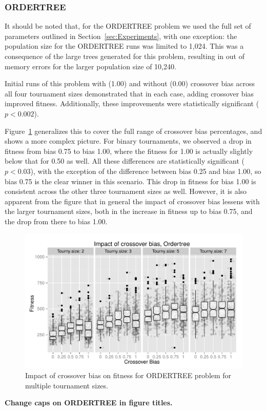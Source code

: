 \documentclass{sig-alternate}
\begin{document}
\subsubsection{ORDERTREE}

It should be noted that, for the ORDERTREE problem we used the full set of parameters outlined in
Section~\ref{sec:Experiments}, with one exception: the population size for the ORDERTREE runs was limited to 1,024.
This was a consequence of the large trees generated for this problem, resulting in out of memory errors for the larger
population size of 10,240.

Initial runs of this problem with (1.00) and without (0.00) crossover bias across all four tournament sizes
demonstrated that in each case, adding crossover bias improved fitness. Additionally, these improvements were
statistically significant ($p < 0.002$).

Figure~\ref{fig:Ordertree_results_all_tournaments_Jan15} generalizes this to cover the full range of crossover bias
percentages, and shows a more complex picture. For binary tournaments, we observed a drop in fitness from bias 0.75 to
bias 1.00, where the fitness for 1.00 is actually slightly below that for 0.50 as well. All these differences are
statistically significant ($p < 0.03$), with the exception of the difference between bias 0.25 and bias 1.00, so bias
0.75 is the clear winner in this scenario. This drop in fitness for bias 1.00 is consistent across the other three
tournament sizes as well. However, it is also apparent from the figure that in general the impact of crossover bias
lessens with the larger tournament sizes, both in the increase in fitness up to bias 0.75, and the drop from there to
bias 1.00.

\begin{figure}
\centering
\includegraphics[width=0.45 \textwidth]{Plots/Ordertree_results_all_tournaments_Jan15.pdf}
\caption{Impact of crossover bias on fitness for ORDERTREE problem for multiple tournament sizes.}
\label{fig:Ordertree_results_all_tournaments_Jan15}
\end{figure}

\textbf{Change caps on ORDERTREE in figure titles.}
\end{document}
